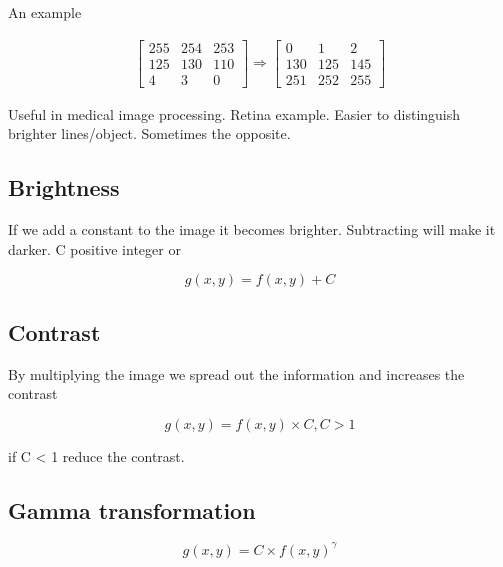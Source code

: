 \begin{example}{An example}

\begin{equation}
\begin{aligned}
\begin{bmatrix} 255& 254& 253 \\ 
                125& 130& 110 \\ 
                4& 3& 0 \end{bmatrix} 
                \Rightarrow 
\begin{bmatrix} 0& 1& 2 \\ 
        130& 125& 145 \\ 
        251& 252& 255
        \end{bmatrix}
\end{aligned}
\end{equation}

\end{example}

Useful in medical image processing. Retina example. Easier to distinguish brighter lines/object. Sometimes the opposite.

\subsection*{Brightness}
If we add a constant to the image it becomes brighter. Subtracting will make it darker. C positive integer or

\begin{equation}
g(x,y) = f(x,y) + C
\end{equation}


\subsection*{Contrast}
By multiplying the image we spread out the information and increases the contrast

\begin{equation}
g(x,y) = f(x,y) \times C, C > 1
\end{equation}

if C < 1 reduce the contrast. 


\subsection*{Gamma transformation}

\begin{equation}
g(x,y) = C \times f(x,y)^{\gamma}
\end{equation}

